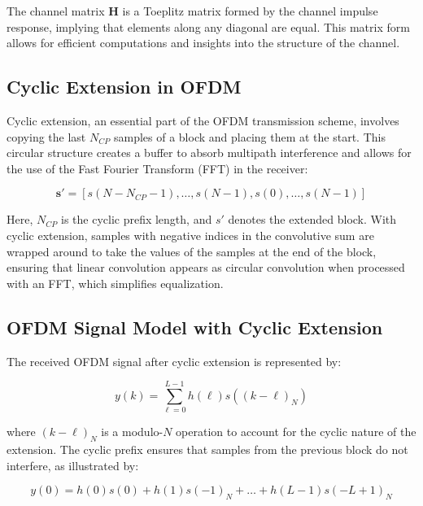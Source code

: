 The channel matrix \(\mathbf{H}\) is a Toeplitz matrix formed by the channel impulse response, implying that elements along any diagonal are equal. This matrix form allows for efficient computations and insights into the structure of the channel.

\subsection*{Cyclic Extension in OFDM}

Cyclic extension, an essential part of the OFDM transmission scheme, involves copying the last \(N_{CP}\) samples of a block and placing them at the start. This circular structure creates a buffer to absorb multipath interference and allows for the use of the Fast Fourier Transform (FFT) in the receiver:

\begin{equation}
    \mathbf{s}' = [s(N - N_{CP} - 1), \ldots, s(N - 1), s(0), \ldots, s(N - 1)]
\end{equation}

Here, \(N_{CP}\) is the cyclic prefix length, and \(s'\) denotes the extended block. With cyclic extension, samples with negative indices in the convolutive sum are wrapped around to take the values of the samples at the end of the block, ensuring that linear convolution appears as circular convolution when processed with an FFT, which simplifies equalization.






\subsection*{OFDM Signal Model with Cyclic Extension}

The received OFDM signal after cyclic extension is represented by:

\begin{equation}
    y(k) = \sum_{\ell=0}^{L-1} h(\ell) s((k - \ell)_N)
\end{equation}

where \((k - \ell)_N\) is a modulo-\(N\) operation to account for the cyclic nature of the extension. The cyclic prefix ensures that samples from the previous block do not interfere, as illustrated by:

\begin{equation}
    y(0) = h(0)s(0) + h(1)s(-1)_N + \ldots + h(L - 1)s(-L + 1)_N
\end{equation}


